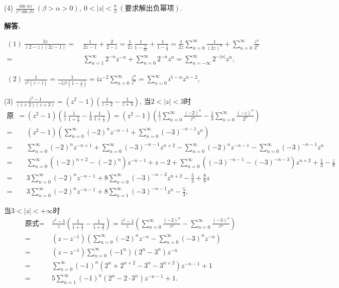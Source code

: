 \documentclass[12pt, a4paper, oneside]{ctexart}
\newenvironment{solution}{\par\noindent\textbf{解答. }}{\bigskip\par}
\def\i{\mathrm{i}}      %
\def\add{\vspace{1ex}}  %
\begin{document}
(4) $\frac{\sin\alpha z}{z^3\sin\beta z}\ (\beta > \alpha > 0),\ 0 < |z| < \frac{\pi}{\beta}\ (\text{要求解出负幂项}).$\add
\begin{solution}\ 

    $\begin{aligned}
        (1)\ \frac{3z}{(2-z)(2z-1)} =&\ \frac{1}{2z-1}+\frac{2}{2-z} = \frac{1}{2z}\,\frac{1}{1-\frac{1}{2z}} + \frac{1}{1-\frac{z}{2}} = \frac{1}{2z}\sum_{n=0}^\infty\frac{1}{(2z)^n}+\sum_{n=0}^\infty \frac{z^n}{2^n}\\
        =&\ \sum_{n=1}^\infty 2^{-n}z^{-n} + \sum_{n=0}^\infty 2^{-n}z^n = \sum_{n=-\infty}^\infty 2^{-|n|}z^n,
    \end{aligned}$

    $\begin{aligned}
        (2)\ \frac{1}{z^2(z-\i)} = \frac{1}{-\i z^2(1-\frac{z}{\i})} = \i z^{-2}\sum_{n=0}^\infty \frac{z^{n}}{i^n} = \sum_{n=0}^\infty i^{1-n}z^{n-2},
    \end{aligned}$

    (3) $\frac{z^2-1}{(z+2)(z+3)} = (z^2-1)\left(\frac{1}{z+2}-\frac{1}{z+3}\right)$, 当$2 < |z| < 3$时
    \begin{align*}
        \text{原式} = &\ (z^2-1)\left(\frac{1}{z}\,\frac{1}{1+\frac{2}{z}}-\frac{1}{3}\,\frac{1}{1+\frac{z}{3}}\right) = (z^2-1)\left(\frac{1}{z}\sum_{n=0}^\infty\frac{(-2)^n}{z^n}-\frac{1}{3}\sum_{n=0}^\infty\frac{(-z)^n}{3^n}\right)\\
        =&\ (z^2-1)\left(\sum_{n=0}^\infty(-2)^nz^{-n-1}+\sum_{n=0}^\infty(-3)^{-n-1}z^n\right)\\
        =&\ \sum_{n=0}^\infty(-2)^nz^{-n+1}+\sum_{n=0}^\infty(-3)^{-n-1}z^{n+2}-\sum_{n=0}^\infty(-2)^nz^{-n-1}-\sum_{n=0}^\infty(-3)^{-n-1}z^n\\
        =&\ \sum_{n=0}^\infty\left((-2)^{n+2}-(-2)^n\right)z^{-n-1}+z-2+\sum_{n=0}^\infty\left((-3)^{-n-1}-(-3)^{-n-3}\right)z^{n+2} + \frac{1}{3}-\frac{z}{9}\\
        =&\ 3\sum_{n=0}^\infty(-2)^nz^{-n-1}+8\sum_{n=0}^\infty(-3)^{-n-3}z^{n+2}-\frac{5}{3}+\frac{8}{9}z\\
        =&\ 3\sum_{n=0}^\infty(-2)^nz^{-n-1}+8\sum_{n=1}^\infty(-3)^{-n-1}z^n-\frac{5}{3},
    \end{align*}

    当$3<|z| < +\infty$时
    \begin{align*}
        \text{原式} =&\ \frac{z^2-1}{z}\left(\frac{1}{1+\frac{2}{z}}-\frac{1}{1+\frac{3}{z}}\right) = \frac{z^2-1}{z}\left(\sum_{n=0}^\infty\frac{(-2)^n}{z^n}-\sum_{n=0}^\infty\frac{(-3)^n}{z^n}\right)\\
        =&\ (z-z^{-1})\left(\sum_{n=0}^\infty(-2)^nz^{-n}-\sum_{n=0}^\infty(-3)^nz^{-n}\right)\\
        =&\ (z-z^{-1})\sum_{n=0}^\infty(-1^{n})(2^n-3^n)z^{-n}\\
        =&\ \sum_{n=0}^\infty(-1)^n(2^n+2^{n+2}-3^n-3^{n+2})z^{-n-1}+1\\
        =&\ 5\sum_{n=1}^\infty(-1)^n(2^n-2\cdot 3^n)z^{-n-1}+1.
    \end{align*}
    

\end{solution}
\end{document}
